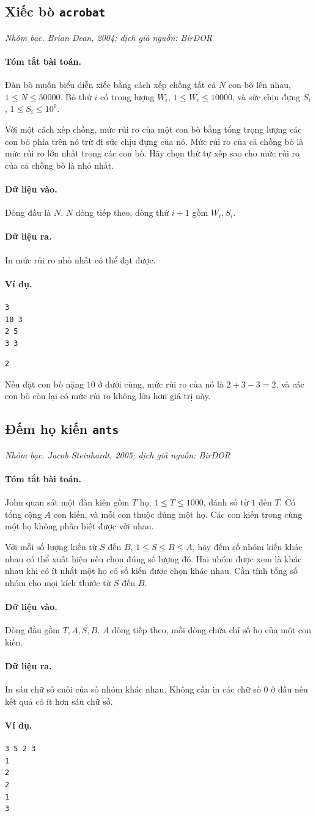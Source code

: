 \documentclass[11pt]{article}
\newcommand{\problem}[4]{%
  \subsection[#1 (#2)]{#1 \hfill {\normalsize\texttt{#2}}}%
  \noindent\textit{#3. #4}\par\smallskip
}
\newcommand{\iosec}[1]{\paragraph{#1}}
\begin{document}
\problem{Xiếc bò}{acrobat}{Nhóm bạc}{Brian Dean, 2004; dịch giả nguồn: BirDOR}

\iosec{Tóm tắt bài toán.}
Đàn bò muốn biểu diễn xiếc bằng cách xếp chồng tất cả \(N\) con bò lên nhau,
\(1\le N\le 50000\). Bò thứ \(i\) có trọng lượng \(W_i\),
\(1\le W_i\le 10000\), và sức chịu đựng \(S_i\), \(1\le S_i\le 10^9\).

Với một cách xếp chồng, mức rủi ro của một con bò bằng tổng trọng lượng các
con bò phía trên nó trừ đi sức chịu đựng của nó. Mức rủi ro của cả chồng bò
là mức rủi ro lớn nhất trong các con bò. Hãy chọn thứ tự xếp sao cho mức rủi
ro của cả chồng bò là nhỏ nhất.

\iosec{Dữ liệu vào.}
Dòng đầu là \(N\). \(N\) dòng tiếp theo, dòng thứ \(i+1\) gồm \(W_i,S_i\).

\iosec{Dữ liệu ra.}
In mức rủi ro nhỏ nhất có thể đạt được.

\iosec{Ví dụ.}
\begin{verbatim}
3
10 3
2 5
3 3
\end{verbatim}

\begin{verbatim}
2
\end{verbatim}

Nếu đặt con bò nặng \(10\) ở dưới cùng, mức rủi ro của nó là
\(2+3-3=2\), và các con bò còn lại có mức rủi ro không lớn hơn giá trị này.

\problem{Đếm họ kiến}{ants}{Nhóm bạc}{Jacob Steinhardt, 2005; dịch giả nguồn: BirDOR}

\iosec{Tóm tắt bài toán.}
John quan sát một đàn kiến gồm \(T\) họ, \(1\le T\le 1000\), đánh số từ \(1\)
đến \(T\). Có tổng cộng \(A\) con kiến, và mỗi con thuộc đúng một họ. Các con
kiến trong cùng một họ không phân biệt được với nhau.

Với mỗi số lượng kiến từ \(S\) đến \(B\), \(1\le S\le B\le A\), hãy đếm số
nhóm kiến khác nhau có thể xuất hiện nếu chọn đúng số lượng đó. Hai nhóm được
xem là khác nhau khi có ít nhất một họ có số kiến được chọn khác nhau. Cần
tính tổng số nhóm cho mọi kích thước từ \(S\) đến \(B\).

\iosec{Dữ liệu vào.}
Dòng đầu gồm \(T,A,S,B\). \(A\) dòng tiếp theo, mỗi dòng chứa chỉ số họ của
một con kiến.

\iosec{Dữ liệu ra.}
In sáu chữ số cuối của số nhóm khác nhau. Không cần in các chữ số \(0\) ở đầu
nếu kết quả có ít hơn sáu chữ số.

\iosec{Ví dụ.}
\begin{verbatim}
3 5 2 3
1
2
2
1
3
\end{verbatim}
\end{document}
